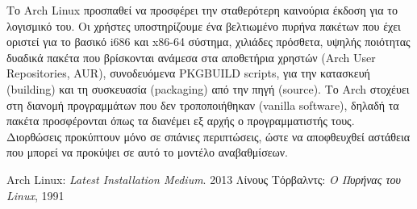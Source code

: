 \documentclass[a4paper,titlepage,oneside,12pt]{article}
\begin{document}
Το Arch Linux προσπαθεί να προσφέρει την σταθερότερη καινούρια έκδοση για το λογισμικό του. Οι χρήστες υποστηρίζουμε ένα βελτιωμένο πυρήνα πακέτων που έχει οριστεί για το βασικό i686 και x86-64 σύστημα, χιλιάδες πρόσθετα, υψηλής ποιότητας δυαδικά πακέτα που βρίσκονται ανάμεσα στα αποθετήρια χρηστών (Arch User Repositories, AUR), συνοδευόμενα PKGBUILD scripts, για την κατασκευή (building) και τη συσκευασία (packaging) από την πηγή (source). Το Arch στοχέυει στη διανομή προγραμμάτων που δεν τροποποιήθηκαν (vanilla software), δηλαδή τα πακέτα προσφέρονται όπως τα διανέμει εξ αρχής ο προγραμματιστής τους. Διορθώσεις προκύπτουν μόνο σε σπάνιες περιπτώσεις, ώστε να αποφθευχθεί αστάθεια που μπορεί να προκύψει σε αυτό το μοντέλο αναβαθμίσεων. 

\begin{thebibliography}{2}

Arch Linux: \emph{Latest Installation Medium}. 2013
Λίνους Τόρβαλντς: \emph{Ο Πυρήνας του Linux}, 1991
  
\end{thebibliography}
\end{document}

